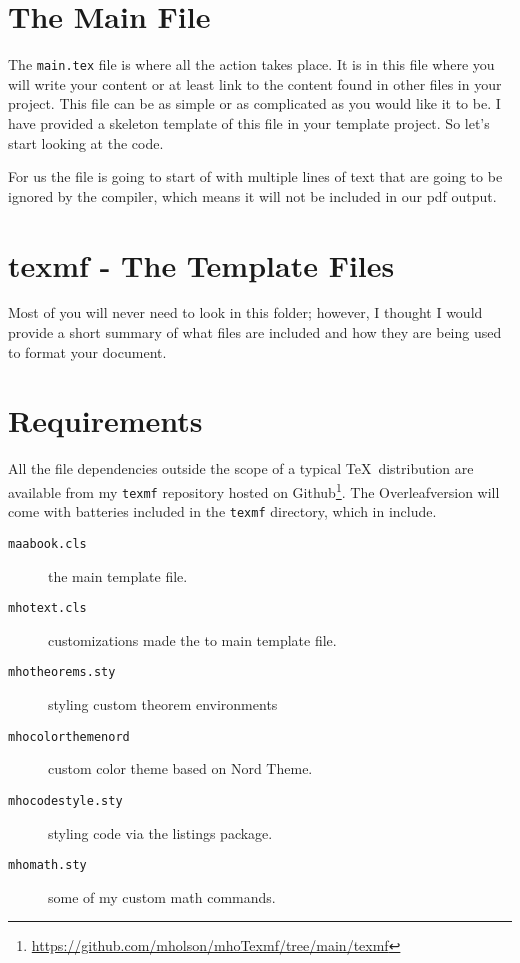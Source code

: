 \section{The Main File}
The \texttt{main.tex} file is where all the action takes place.  It is in this
file where you will write your content or at least link to the content found in
other files in your project.  This file can be as simple or as complicated as 
you would like it to be.  I have provided a skeleton template of this file in
your template project.  So let's start looking at the code.

For us the file is going to start of with multiple lines of text that are going
to be ignored by the compiler, which means it will not be included in our pdf
output.

\section{texmf - The Template Files}

Most of you will never need to look in this folder; however, I thought I would
provide a short summary of what files are included and how they are being used
to format your document.

\section{Requirements}

All the file dependencies outside the scope of a typical \TeX\, distribution
are available from my \texttt{texmf} repository hosted on
Github\footnote{\url{https://github.com/mholson/mhoTexmf/tree/main/texmf}}.
The Overleaf\texttrademark version will come with batteries included in the 
\texttt{texmf} directory, which in include.  
\begin{description}
    \item[\texttt{maabook.cls}] the main template file.
    \item[\texttt{mhotext.cls}] customizations made the to main template file.
    \item[\texttt{mhotheorems.sty}] styling custom theorem environments
    \item[\texttt{mhocolorthemenord}] custom color theme based on Nord Theme.
    \item[\texttt{mhocodestyle.sty}] styling code via the listings package.
    \item[\texttt{mhomath.sty}] some of my custom math commands.  
\end{description}


